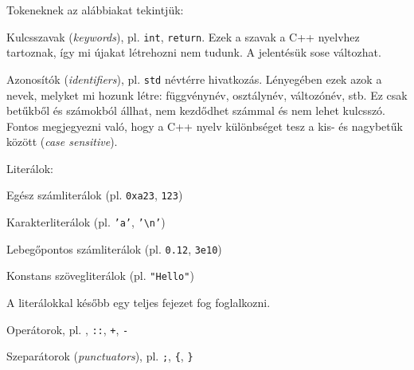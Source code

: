 \documentclass[a4paper,11.5pt,table]{article}
\begin{document}
	Tokeneknek az alábbiakat tekintjük:
	\begin{compactitem}
		\item Kulcsszavak (\textit{keywords}), pl. \texttt{int}, \texttt{return}. Ezek a szavak a C++ nyelvhez tartoznak, így mi újakat létrehozni nem tudunk. A jelentésük sose változhat.
		\item Azonosítók (\textit{identifiers}), pl. \texttt{std} névtérre hivatkozás. Lényegében ezek azok a nevek, melyket mi hozunk létre: függvénynév, osztálynév, változónév, stb. Ez csak betűkből és számokból állhat, nem kezdődhet számmal és nem lehet kulcsszó. Fontos megjegyezni való, hogy a C++ nyelv különbséget tesz a kis- és nagybetűk között (\textit{case sensitive}).
 		\item Literálok:
		\begin{compactitem}
			\item Egész számliterálok (pl. \texttt{0xa23}, \texttt{123})
			\item Karakterliterálok (pl. \texttt{'a'}, \texttt{'\textbackslash n'})
			\item Lebegőpontos számliterálok (pl. \texttt{0.12}, \texttt{3e10})
			\item Konstans szövegliterálok (pl. \texttt{"Hello"})
		\end{compactitem}
		A literálokkal később egy teljes fejezet fog foglalkozni.
		\item Operátorok, pl. \texttt{\<}, \texttt{::}, \texttt{+}, \texttt{-}
		\item Szeparátorok (\textit{punctuators}), pl. \texttt{;}, \texttt{\{}, \texttt{\}}
	\end{compactitem}
\end{document}
